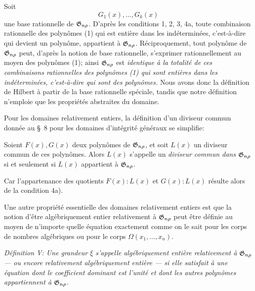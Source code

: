 Soit
\begin{equation}
  G_1(x),\ldots,G_k(x)
\tag{1}
\end{equation}
une base rationnelle de $\mathfrak{G}_{n\rho}$. D'après les conditions 1, 2, 3, 4a, toute combinaison rationnelle des polynômes (1) qui est entière dans les indéterminées, c'est-à-dire qui devient un polynôme, appartient à $\mathfrak{G}_{n\rho}$. Réciproquement, tout polynôme de $\mathfrak{G}_{n\rho}$ peut, d'après la notion de base rationnelle, s'exprimer rationnellement au moyen des polynômes (1); ainsi $\mathfrak{G}_{n\rho}$ est \emph{identique à la totalité de ces combinaisons rationnelles des polynômes (1) qui sont entières dans les indéterminées, c'est-à-dire qui sont des polynômes.} Nous avons donc la définition de Hilbert à partir de la base rationnelle spéciale, tandis que notre définition n'emploie que les propriétés abstraites du domaine.

Pour les domaines relativement entiers, la définition d'un diviseur commun donnée au \S\ 8 pour les domaines d’intégrité généraux se simplifie:

Soient $F(x),G(x)$ deux polynômes de $\mathfrak{G}_{n\rho}$, et soit $L(x)$ un diviseur commun de ces polynômes. Alors $L(x)$ s'appelle un \emph{diviseur commun dans $\mathfrak{G}_{n\rho}$} si et seulement si $L(x)$ appartient à $\mathfrak{G}_{n\rho}$.

Car l'appartenance des quotients $F(x):L(x)$ et $G(x):L(x)$ résulte alors de la condition 4a).

Une autre propriété essentielle des domaines relativement entiers est que la notion d'être \og{} algébriquement entier relativement à $\mathfrak{G}_{n\rho}$ \fg{} peut être définie au moyen de n'importe quelle équation exactement comme on le sait pour les corps de nombres algébriques ou pour le corps $\Omega(x_1,
\ldots,x_n)$.

\emph{Définition V: Une grandeur $\xi$ s'appelle algébriquement entière relativement à $\mathfrak{G}_{n\rho}$ --- ou encore relativement algébriquement entière --- si elle satisfait à une équation dont le coefficient dominant est l'unité et dont les autres polynômes appartiennent à $\mathfrak{G}_{n\rho}$.}


